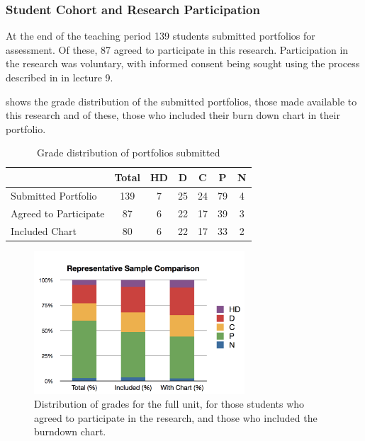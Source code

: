 
\subsubsection{Student Cohort and Research Participation} %
\label{sub:progress_student_cohort}

At the end of the teaching period 139 students submitted portfolios for assessment. Of these, 87 agreed to participate in this research. Participation in the research was voluntary, with informed consent being sought using the process described in  in lecture 9.

 shows the grade distribution of the submitted portfolios, those made available to this research and of these, those who included their burn down chart in their portfolio.

\begin{table}[hbp]
  \footnotesize
  \renewcommand{\arraystretch}{1.3}
  \caption{Grade distribution of portfolios submitted}
  \label{tbl:progress_student_numbers}
  \centering
  \begin{tabular}{l|c|c|c|c|c|c}
        ~                     & Total & HD & D & C & P & N  \\ \hline
        Submitted Portfolio   & 139    & 7                & 25          & 24     & 79   & 4     \\ %
        Agreed to Participate & 87    & 6                & 22          & 17     & 39   & 3     \\ %
        Included Chart & 80 & 6 & 22 & 17 & 33 & 2 \\
  \end{tabular}
\end{table}

\begin{figure}[thbp]
  \centering
  \includegraphics[width=0.7\textwidth]{ProgressGradeDistributions}
  \caption{Distribution of grades for the full unit, for those students who agreed to participate in the research, and those who included the burndown chart.}
  \label{fig:progress_grade_dist}
\end{figure}

